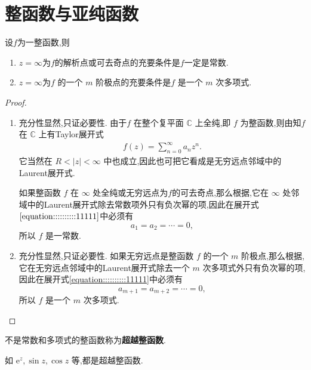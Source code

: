 \documentclass[../../main.tex]{subfiles}%
\begin{document}
\section{整函数与亚纯函数}

\begin{theorem}\label{theorem:定理5.3.1}
设$f$为一整函数,则
\begin{enumerate}[(1)]
\item\label{theorem:定理5.3.1-1} $z = \infty$为$f$的解析点或可去奇点的充要条件是$f$一定是常数.

\item\label{theorem:定理5.3.1-2} $z = \infty$为\( f \) 的一个 \( m \) 阶极点的充要条件是\( f \) 是一个 \( m \) 次多项式.
\end{enumerate}
\end{theorem}
\begin{proof}
\begin{enumerate}[(1)]
\item 充分性显然,只证必要性.
由于\( f \) 在整个复平面 \( \mathbb{C} \) 上全纯,即 \( f \) 为整函数,则由知\( f \) 在 \( \mathbb{C} \) 上有Taylor展开式
\begin{align}
f(z) = \sum_{n = 0}^{\infty} a_n z^n. \label{equation::::::::::11111}
\end{align}
它当然在 \( R < |z| < \infty \) 中也成立,因此也可把它看成是无穷远点邻域中的Laurent展开式.

如果整函数 \( f \) 在 \( \infty \) 处全纯或无穷远点为$f$的可去奇点,那么根据,它在 \( \infty \) 处邻域中的Laurent展开式除去常数项外只有负次幂的项,因此在展开式\(\eqref{equation::::::::::11111}\)中必须有
\[
a_1 = a_2 = \cdots = 0,
\]
所以 \( f \) 是一常数.

\item 充分性显然,只证必要性.
如果无穷远点是整函数 \( f \) 的一个 \( m \) 阶极点,那么根据,它在无穷远点邻域中的Laurent展开式除去一个 \( m \) 次多项式外只有负次幂的项,因此在展开式\eqref{equation::::::::::11111}中必须有
\[
a_{m + 1} = a_{m + 2} = \cdots = 0,
\]
所以 \( f \) 是一个 \( m \) 次多项式.

\end{enumerate}

\end{proof}

\begin{definition}
不是常数和多项式的整函数称为\textbf{超越整函数}.
\end{definition}
\begin{remark}
如 \( \mathrm{e}^z,\sin z,\cos z \) 等,都是超越整函数.
\end{remark}
\end{document}

